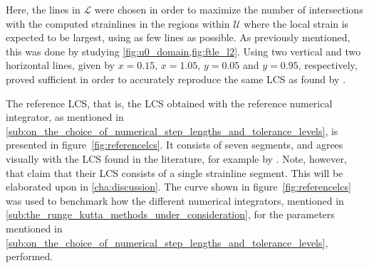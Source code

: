 Here, the lines in $\mathcal{L}$ were chosen in order to maximize the number of
intersections with the computed strainlines in the regions within $\mathcal{U}$
where the local strain is expected to be largest, using as few lines as
possible. As previously mentioned, this was done by studying
\cref{fig:u0_domain,fig:ftle_l2}. Using two vertical and two horizontal lines,
given by $x=0.15$, $x=1.05$, $y=0.05$ and $y=0.95$, respectively, proved
sufficient in order to accurately reproduce the same LCS as found by
\textcite{farazmand2012computing}.




\clearpage
The reference LCS, that is, the LCS obtained with the reference numerical
integrator, as mentioned in
\cref{sub:on_the_choice_of_numerical_step_lengths_and_tolerance_levels}, is
presented in figure~\ref{fig:referencelcs}. It consists of seven segments,
and agrees visually with the LCS found in the literature, for example by
\textcite{farazmand2012computing}. Note, however, that
\citeauthor{farazmand2012computing} claim that their LCS consists of a single
strainline segment. This will be elaborated upon in
\cref{cha:discussion}. The curve shown in figure~\ref{fig:referencelcs} was used to
benchmark how the different numerical integrators, mentioned in
\cref{sub:the_runge_kutta_methods_under_consideration}, for the parameters
mentioned in
\cref{sub:on_the_choice_of_numerical_step_lengths_and_tolerance_levels},
performed.





